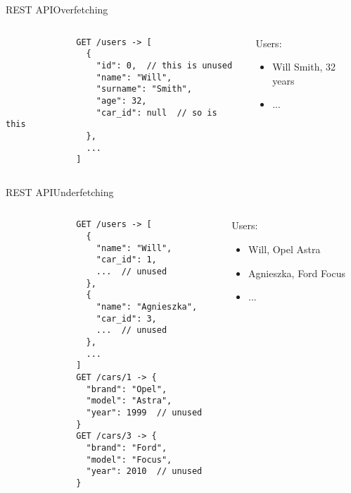 \documentclass{beamer}
\begin{document}
  \begin{frame}[fragile]{REST API}{Overfetching}
    \begin{columns}
        \begin{column}{0.48\textwidth}
          \scriptsize
          \begin{verbatim}
              GET /users -> [
                {
                  "id": 0,  // this is unused
                  "name": "Will",
                  "surname": "Smith",
                  "age": 32,
                  "car_id": null  // so is this
                },
                ...
              ]
          \end{verbatim}
        \end{column}
        \begin{column}{0.48\textwidth}
          Users:
          \begin{itemize}
            \item Will Smith, 32 years
            \item ...
          \end{itemize}
        \end{column}
    \end{columns}
  \end{frame}
  \begin{frame}[fragile]{REST API}{Underfetching}
    \begin{columns}
        \begin{column}{0.48\textwidth}
          \scriptsize
          \begin{verbatim}
              GET /users -> [
                {
                  "name": "Will",
                  "car_id": 1,
                  ...  // unused
                },
                {
                  "name": "Agnieszka",
                  "car_id": 3,
                  ...  // unused
                },
                ...
              ]
              GET /cars/1 -> {
                "brand": "Opel",
                "model": "Astra",
                "year": 1999  // unused
              }
              GET /cars/3 -> {
                "brand": "Ford",
                "model": "Focus",
                "year": 2010  // unused
              }
          \end{verbatim}
        \end{column}
        \begin{column}{0.48\textwidth}
          Users:
          \begin{itemize}
            \item Will, Opel Astra
            \item Agnieszka, Ford Focus
            \item ...
          \end{itemize}
        \end{column}
    \end{columns}
  \end{frame}
\end{document}
